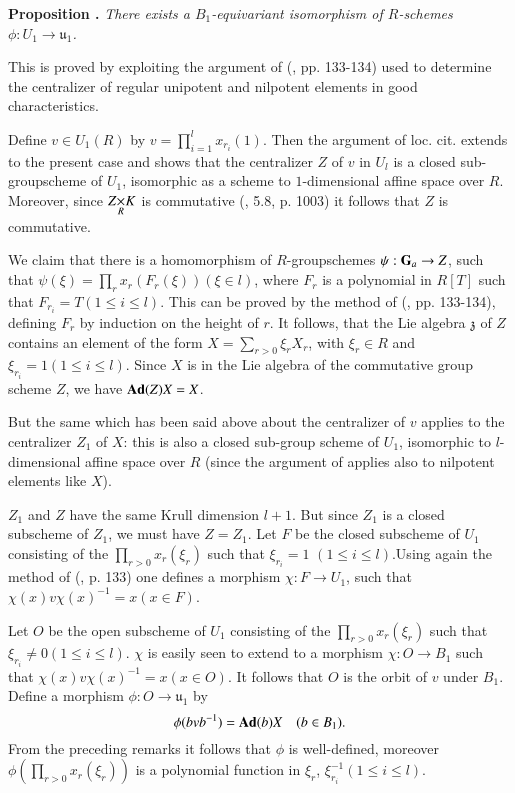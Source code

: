 \medskip
\noindent
{\bf Proposition .\label{art19-prop3.5}}
{\em There exists a $B_{1}$-equivariant isomorphism of $R$-sche\-mes $\phi:U_{1}\to \mathfrak{u}_{1}$.}
\smallskip

This is proved by exploiting the argument of (\cite{art19-key14}, pp. 133-134) used to determine the centralizer of regular unipotent and nilpotent elements in good characteristics.

Define $v\in U_{1}(R)$ by $v=\prod\limits^{l}_{i=1}x_{r_{i}}(1)$. Then the argument of loc. cit. extends to the present case and shows that the centralizer $Z$ of $v$ in $U_{l}$ is a closed sub-groupscheme of $U_{1}$, isomorphic as a scheme to $1$-dimensional affine space over $R$. Moreover, since $\fprod{Z}{K}{R}$ is commutative (\cite{art19-key8}, 5.8, p. 1003) it follows that $Z$ is commutative.

We claim that there is a homomorphism of $R$-groupschemes $\psi:\mathbf{G}_{a}\to Z$, such that $\psi(\xi)=\prod\limits_{r}x_{r}(F_{r}(\xi))(\xi\in l)$, where $F_{r}$ is a polynomial in $R[T]$ such that $F_{r_{i}}=T(1\leq i\leq l)$. This can be proved by the method of (\cite{art19-key14}, pp. 133-134), defining $F_{r}$ by induction on the height of $r$. It follows, that the Lie algebra $\mathfrak{z}$ of $Z$ contains an element of the form $X=\sum\limits_{r>0}\xi_{r}X_{r}$, with $\xi_{r}\in R$ and $\xi_{r_{i}}=1(1\leq i\leq l)$. Since $X$ is in the Lie algebra of the commutative group scheme $Z$, we have $\mathbf{Ad}(Z)X=X$.

But the same which has been said above about the centralizer of $v$ applies to the centralizer $Z_{1}$ of $X$: this is also a closed sub-group scheme of $U_{1}$, isomorphic to $l$-dimensional affine space over $R$ (since the argument of \cite{art19-key14} applies also to nilpotent elements like $X$).

$Z_{1}$ and $Z$ have the same Krull dimension $l+1$. But since $Z_{1}$ is a closed subscheme of $Z_{1}$, we must have $Z=Z_{1}$. Let $F$ be the closed subscheme of $U_{1}$ consisting of the $\prod\limits_{r>0}x_{r}(\xi_{r})$ such that $\xi_{r_{i}}=1$ $(1\leq i\leq l)$.\pageoriginale Using again the method of (\cite{art19-key14}, p. 133) one defines a morphism $\chi : F\to U_{1}$, such that $\chi(x)v\chi(x)^{-1}=x(x\in F)$.

\eject

Let $O$ be the open subscheme of $U_{1}$ consisting of the $\prod\limits_{r>0}x_{r}(\xi_{r})$ such that $\xi_{r_{i}}\neq 0(1\leq i\leq l)$. $\chi$ is easily seen to extend to a morphism $\chi : O\to B_{1}$ such that $\chi(x)v\chi(x)^{-1}=x(x\in O)$. It follows that $O$ is the orbit of $v$ under $B_{1}$. Define a morphism $\phi:O\to \mathfrak{u}_{1}$ by
\begin{equation}
\phi(bvb^{-1})=\mathbf{Ad} (b)X\quad (b\in B_{1}).\label{art19-eq2}
\end{equation}
From the preceding remarks it follows that $\phi$ is well-defined, moreover $\phi(\prod\limits_{r>0}x_{r}(\xi_{r}))$ is a polynomial function in $\xi_{r}$, $\xi^{-1}_{r_{i}}(1\leq i\leq l)$.


